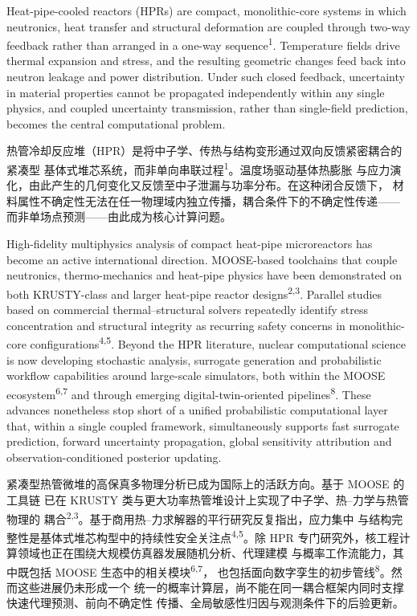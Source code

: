 \documentclass[11pt,a4paper]{article}
\begin{document}
Heat-pipe-cooled reactors (HPRs) are compact, monolithic-core systems in which
neutronics, heat transfer and structural deformation are coupled through
two-way feedback rather than arranged in a one-way sequence\textsuperscript{1}.
Temperature fields drive thermal expansion and stress, and the resulting
geometric changes feed back into neutron leakage and power distribution. Under
such closed feedback, uncertainty in material properties cannot be propagated
independently within any single physics, and coupled uncertainty transmission,
rather than single-field prediction, becomes the central computational problem.

热管冷却反应堆（HPR）是将中子学、传热与结构变形通过双向反馈紧密耦合的紧凑型
基体式堆芯系统，而非单向串联过程\textsuperscript{1}。温度场驱动基体热膨胀
与应力演化，由此产生的几何变化又反馈至中子泄漏与功率分布。在这种闭合反馈下，
材料属性不确定性无法在任一物理域内独立传播，耦合条件下的不确定性传递——
而非单场点预测——由此成为核心计算问题。

High-fidelity multiphysics analysis of compact heat-pipe microreactors has
become an active international direction. MOOSE-based toolchains that couple
neutronics, thermo-mechanics and heat-pipe physics have been demonstrated on
both KRUSTY-class and larger heat-pipe reactor designs\textsuperscript{2,3}.
Parallel studies based on commercial thermal--structural solvers repeatedly
identify stress concentration and structural integrity as recurring safety
concerns in monolithic-core configurations\textsuperscript{4,5}. Beyond the HPR
literature, nuclear computational science is now developing stochastic
analysis, surrogate generation and probabilistic workflow capabilities around
large-scale simulators, both within the MOOSE
ecosystem\textsuperscript{6,7} and through emerging digital-twin-oriented
pipelines\textsuperscript{8}. These advances nonetheless stop short of a
unified probabilistic computational layer that, within a single coupled
framework, simultaneously supports fast surrogate prediction, forward
uncertainty propagation, global sensitivity attribution and
observation-conditioned posterior updating.

紧凑型热管微堆的高保真多物理分析已成为国际上的活跃方向。基于 MOOSE 的工具链
已在 KRUSTY 类与更大功率热管堆设计上实现了中子学、热--力学与热管物理的
耦合\textsuperscript{2,3}。基于商用热--力求解器的平行研究反复指出，应力集中
与结构完整性是基体式堆芯构型中的持续性安全关注点\textsuperscript{4,5}。除
HPR 专门研究外，核工程计算领域也正在围绕大规模仿真器发展随机分析、代理建模
与概率工作流能力，其中既包括 MOOSE 生态中的相关模块\textsuperscript{6,7}，
也包括面向数字孪生的初步管线\textsuperscript{8}。然而这些进展仍未形成一个
统一的概率计算层，尚不能在同一耦合框架内同时支撑快速代理预测、前向不确定性
传播、全局敏感性归因与观测条件下的后验更新。
\end{document}
